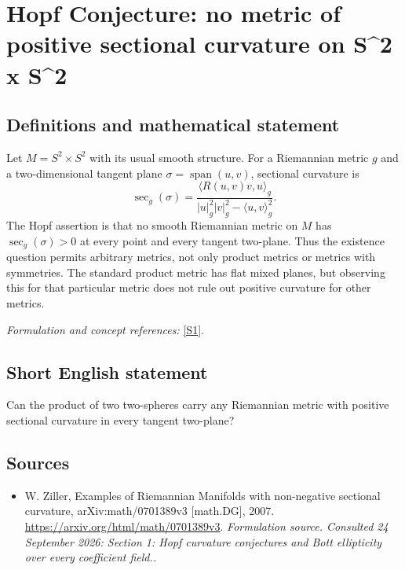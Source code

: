 \documentclass[11pt]{article}
\begin{document}
\section*{\texorpdfstring{Hopf Conjecture: no metric of positive sectional curvature on S\textasciicircum{}2 x S\textasciicircum{}2}{Hopf Conjecture: no metric of positive sectional curvature on S\textasciicircum{}2 x S\textasciicircum{}2}}\label{statement}
\subsection{Definitions and mathematical statement}
Let $M=S^2\times S^2$ with its usual smooth structure. For a Riemannian metric $g$ and a two-dimensional tangent plane $\sigma=\operatorname{span}(u,v)$, sectional curvature is
\[
 \sec_g(\sigma)=\frac{\langle R(u,v)v,u\rangle_g}
 {|u|_g^2|v|_g^2-\langle u,v\rangle_g^2}.
\]
The Hopf assertion is that no smooth Riemannian metric on $M$ has $\sec_g(\sigma)>0$ at every point and every tangent two-plane. Thus the existence question permits arbitrary metrics, not only product metrics or metrics with symmetries. The standard product metric has flat mixed planes, but observing this for that particular metric does not rule out positive curvature for other metrics.
\par\smallskip\textit{Formulation and concept references:} \href{https://arxiv.org/html/math/0701389v3}{[S1]}.

\subsection{Short English statement}
Can the product of two two-spheres carry any Riemannian metric with positive sectional curvature in every tangent two-plane?
\subsection{Sources}
\begin{itemize}
\item[S1]W. Ziller, Examples of Riemannian Manifolds with non-negative sectional curvature, arXiv:math/0701389v3 [math.DG], 2007.
\url{https://arxiv.org/html/math/0701389v3}.
\textit{Formulation source. Consulted 24 September 2026: Section 1: Hopf curvature conjectures and Bott ellipticity over every coefficient field..}
\end{itemize}
\end{document}
